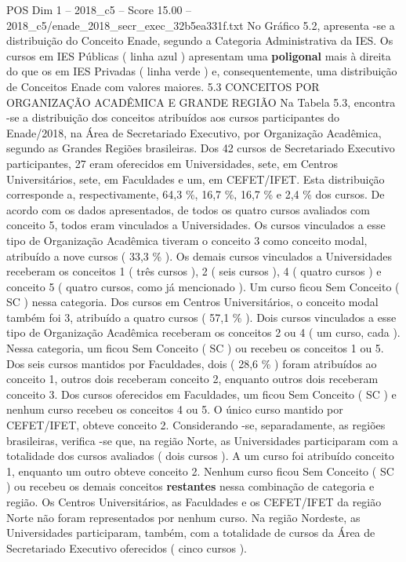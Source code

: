 \begin{textsample}{POS Dim 1 – 2018\_c5 – Score 15.00 – 2018\_c5/enade\_2018\_secr\_exec\_32b5ea331f.txt}
No Gráfico 5.2, apresenta -se a distribuição do Conceito Enade, segundo a Categoria Administrativa da IES.
Os cursos em IES Públicas ( linha azul ) apresentam uma \textbf{poligonal} mais à direita do que os em IES Privadas ( linha verde ) e, consequentemente, uma distribuição de Conceitos Enade com valores maiores. 5.3 CONCEITOS POR ORGANIZAÇÃO ACADÊMICA E GRANDE REGIÃO Na Tabela 5.3, encontra -se a distribuição dos conceitos atribuídos aos cursos participantes do Enade/2018, na Área de Secretariado Executivo, por Organização Acadêmica, segundo as Grandes Regiões brasileiras.
Dos 42 cursos de Secretariado Executivo participantes, 27 eram oferecidos em Universidades, sete, em Centros Universitários, sete, em Faculdades e um, em CEFET/IFET.
Esta distribuição corresponde a, respectivamente, 64,3 \%, 16,7 \%, 16,7 \% e 2,4 \% dos cursos.
De acordo com os dados apresentados, de todos os quatro cursos avaliados com conceito 5, todos eram vinculados a Universidades.
Os cursos vinculados a esse tipo de Organização Acadêmica tiveram o conceito 3 como conceito modal, atribuído a nove cursos ( 33,3 \% ).
Os demais cursos vinculados a Universidades receberam os conceitos 1 ( três cursos ), 2 ( seis cursos ), 4 ( quatro cursos ) e conceito 5 ( quatro cursos, como já mencionado ).
Um curso ficou Sem Conceito ( SC ) nessa categoria.
Dos cursos em Centros Universitários, o conceito modal também foi 3, atribuído a quatro cursos ( 57,1 \% ).
Dois cursos vinculados a esse tipo de Organização Acadêmica receberam os conceitos 2 ou 4 ( um curso, cada ).
Nessa categoria, um ficou Sem Conceito ( SC ) ou recebeu os conceitos 1 ou 5.
Dos seis cursos mantidos por Faculdades, dois ( 28,6 \% ) foram atribuídos ao conceito 1, outros dois receberam conceito 2, enquanto outros dois receberam conceito 3.
Dos cursos oferecidos em Faculdades, um ficou Sem Conceito ( SC ) e nenhum curso recebeu os conceitos 4 ou 5.
O único curso mantido por CEFET/IFET, obteve conceito 2.
Considerando -se, separadamente, as regiões brasileiras, verifica -se que, na região Norte, as Universidades participaram com a totalidade dos cursos avaliados ( dois cursos ).
A um curso foi atribuído conceito 1, enquanto um outro obteve conceito 2.
Nenhum curso ficou Sem Conceito ( SC ) ou recebeu os demais conceitos \textbf{restantes} nessa combinação de categoria e região.
Os Centros Universitários, as Faculdades e os CEFET/IFET da região Norte não foram representados por nenhum curso.
Na região Nordeste, as Universidades participaram, também, com a totalidade de cursos da Área de Secretariado Executivo oferecidos ( cinco cursos ).

\end{textsample}
